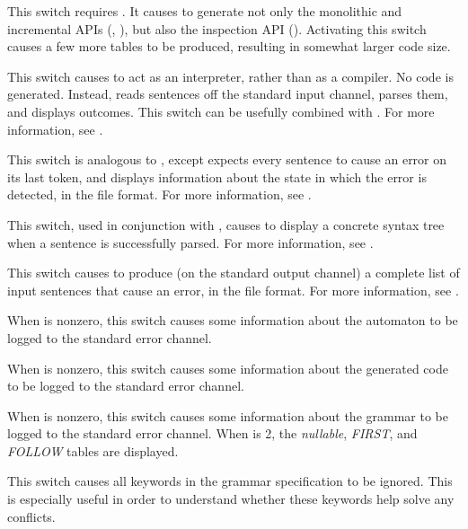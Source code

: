 \documentclass[onecolumn,11pt,nocopyrightspace,preprint]{sigplanconf}
\begin{document}

\docswitch{\oinspection} This switch requires \otable. It causes \menhir to generate
not only the monolithic and incremental APIs (,
), but also the inspection API ().
Activating this switch causes a few more tables to be produced, resulting in
somewhat larger code size.

\docswitch{\ointerpret} This switch causes \menhir to act as an interpreter,
rather than as a compiler. No \ocaml code is generated. Instead, \menhir
reads sentences off the standard input channel, parses them, and displays
outcomes. This switch can be usefully combined with \otrace.
For more information, see .

\docswitch{\ointerpreterror} This switch is analogous to \ointerpret, except
\menhir expects every sentence to cause an error on its last token, and
displays information about the state in which the error is detected, in
the \messages file format. For more information, see .

\docswitch{\ointerpretshowcst} This switch, used in conjunction with \ointerpret,
causes \menhir to display a concrete syntax tree when a sentence is successfully
parsed. For more information, see .

\docswitch{\olisterrors} This switch causes \menhir to produce (on the standard
output channel) a complete list of input sentences that cause an error, in the
\messages file format. For more information, see .

 When  is nonzero, this switch
causes some information about the automaton to be logged to the standard error
channel.

 When  is nonzero, this switch
causes some information about the generated \ocaml code to be logged to the
standard error channel.

 When  is nonzero, this switch
causes some information about the grammar to be logged to the standard error
channel. When  is 2, the \emph{nullable}, \emph{FIRST}, and
\emph{FOLLOW} tables are displayed.

\docswitch{\onoinline} This switch causes all \dinline keywords in the
grammar specification to be ignored. This is especially useful in order
to understand whether these keywords help solve any conflicts.
\end{document}
